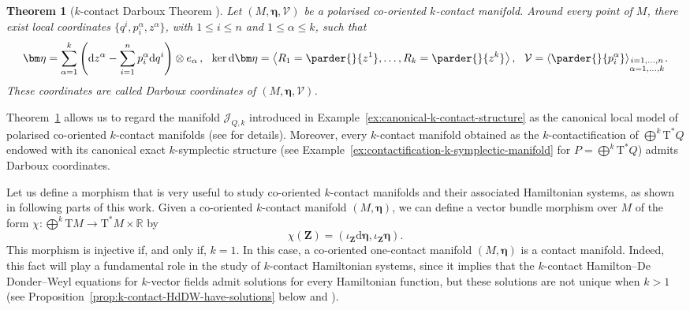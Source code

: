 \documentclass[11pt,twoside]{article}
\theoremstyle{plain}
\newtheorem{theorem}{Theorem}[section]
\theoremstyle{definition}
\theoremstyle{remark}
\newcommand{\dd}{\mathrm{d}}
\newcommand{\T}{\mathrm{T}}
\newcommand{\cT}{\mathrm{T}^\ast}
\begin{document}
\begin{theorem}[$k$-contact Darboux Theorem \cite{Riv_22}]
\label{thm:kcontDarboux}
Let $(M,\bm\eta,\mathcal{V})$ be a polarised co-oriented $k$-contact manifold. Around every point of $M$, there exist local coordinates $\{q^i,p_i^\alpha,z^\alpha\}$, with $1 \leq i \leq n$ and $1 \leq \alpha \leq k$, such that
\[
\bm \eta = \sum_{\alpha=1}^k \left(\dd z^\alpha - \sum_{i=1}^np_i^\alpha \dd q^i\right)\otimes e_\alpha\,,
\quad\!\!
\ker \dd \bm\eta = \left\langle R_1 = \parder{}{z^1} ,\dotsc,R_k = \parder{}{z^k} \right\rangle,
\quad\!\!
\mathcal{V} = \left\langle \parder{}{p_i^\alpha} \right\rangle_{\substack{i=1,\dotsc,n\\\alpha=1,\dotsc,k}}\!.
\]
These coordinates are called \textit{Darboux coordinates} of $(M,\bm\eta,\mathcal{V})$.
\end{theorem}

Theorem~\ref{thm:kcontDarboux} allows us to regard the manifold $\mathcal{J}_{Q,k}$ introduced in Example~\ref{ex:canonical-k-contact-structure} as the canonical local model of polarised co-oriented $k$-contact manifolds (see \cite{LRS_25} for details). Moreover, every $k$-contact manifold obtained as the $k$-contactification of $\bigoplus^k \cT Q$ endowed with its canonical exact $k$-symplectic structure (see Example~\ref{ex:contactification-k-symplectic-manifold} for $P=\bigoplus^k \cT Q$) admits Darboux coordinates.

Let us define a morphism that is very useful to study co-oriented $k$-contact manifolds and their associated Hamiltonian systems, as shown in following parts of this work. Given a co-oriented $k$-contact manifold $(M,\bm\eta)$, we can define a vector bundle morphism over $M$ of the form $\chi\colon \bigoplus^k\T M \to \cT M\times \mathbb{R}$ by
\[
\chi({\bm Z}) = (\iota_{\bm Z} \dd \bm\eta,\iota_{\bm Z}\bm\eta).
\]  
This morphism is injective if, and only if, $k=1$. In this case, a co-oriented one-contact manifold $(M,\bm\eta)$ is a contact manifold. Indeed, this fact will play a fundamental role in the study of $k$-contact Hamiltonian systems, since it implies that the $k$-contact Hamilton--De Donder--Weyl equations for $k$-vector fields admit solutions for every Hamiltonian function, but these solutions are not unique when $k>1$ (see Proposition~\ref{prop:k-contact-HdDW-have-solutions} below and \cite{HLM_26}).
\end{document}
